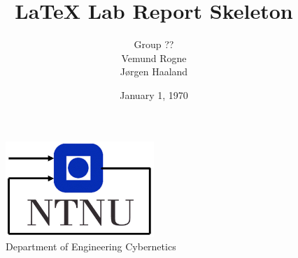 \documentclass[11pt, a4paper, USenglish]{article} %
\begin{document}
\title{LaTeX Lab Report Skeleton}
\author{Group ??\\Vemund Rogne\\Jørgen Haaland}
\date{January 1, 1970}
\begin{titlepage}
    \maketitle
    \begin{figure}
    \centering
    \includegraphics[width=0.5\textwidth]{figures/itk_ntnu}\\
    Department of Engineering Cybernetics
    \end{figure}
    \thispagestyle{empty}
\end{titlepage}

\newpage
\tableofcontents
\thispagestyle{empty} %


\newpage
\setcounter{page}{1}






\newpage
{}


\label{sec:bibliography}
\end{document}
